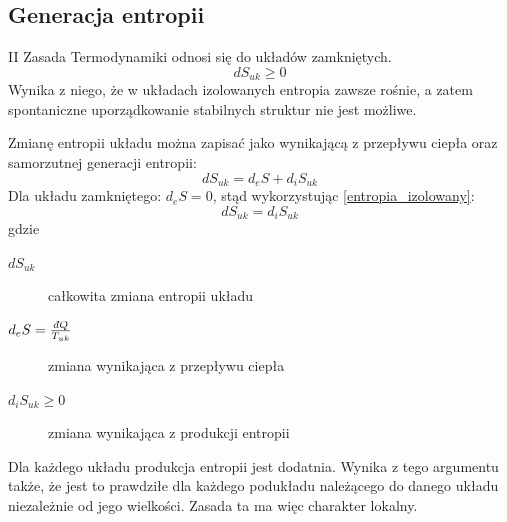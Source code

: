 \documentclass[10pt, a4paper, twoside, onecolumn]{article}
\numberwithin{equation}{section}
\newcommand{\dbar}{d\hspace*{-0.08em}\bar{}\hspace*{0.1em}}
\begin{document}
	\subsection{Generacja entropii}
	II Zasada Termodynamiki odnosi się do układów zamkniętych.
	\begin{equation}\label{entropia_izolowany}
		dS_{uk}\geq 0
	\end{equation}
	Wynika z niego, że w układach izolowanych entropia zawsze rośnie, a zatem spontaniczne uporządkowanie stabilnych struktur nie jest możliwe. \par
	Zmianę entropii układu można zapisać jako wynikającą z przepływu ciepła oraz samorzutnej generacji entropii: 
	\begin{equation}
		dS_{uk}=d_{e}S+d_{i}S_{uk}
	\end{equation}
	Dla układu zamkniętego: \(d_{e}S=0\), stąd wykorzystując \eqref{entropia_izolowany}:
	\begin{equation}
		dS_{uk}=d_{i}S_{uk}
	\end{equation}
	gdzie
	\begin{description}
		\item[\(dS_{uk}\)] całkowita zmiana entropii układu
		\item[\(d_{e}S=\frac{\dbar Q}{T_{uk}}\)] zmiana wynikająca z przepływu ciepła
		\item[\(d_{i}S_{uk}\geq 0\)] zmiana wynikająca z produkcji entropii
	\end{description}
	Dla każdego układu produkcja entropii jest dodatnia. Wynika z tego argumentu także, że jest to prawdziłe dla każdego podukładu należącego do danego układu niezależnie od jego wielkości. Zasada ta ma więc charakter lokalny. 
\end{document}
